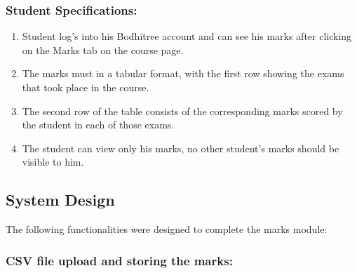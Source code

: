 \subsubsection*{Student Specifications:}

\begin{enumerate}
	\item Student log's into his Bodhitree account and can see his marks after clicking on the Marks tab on the course page.
	\item The marks must in a tabular format, with the first row showing the exams that took place in the course.
	\item The second row of the table consists of the corresponding marks scored by the student in each of those exams.
	\item The student can view only his marks, no other student's marks should be visible to him.
\end{enumerate}

\subsection{System Design}

The following functionalities were designed to complete the marks module:

\subsubsection*{CSV file upload and storing the marks:}

